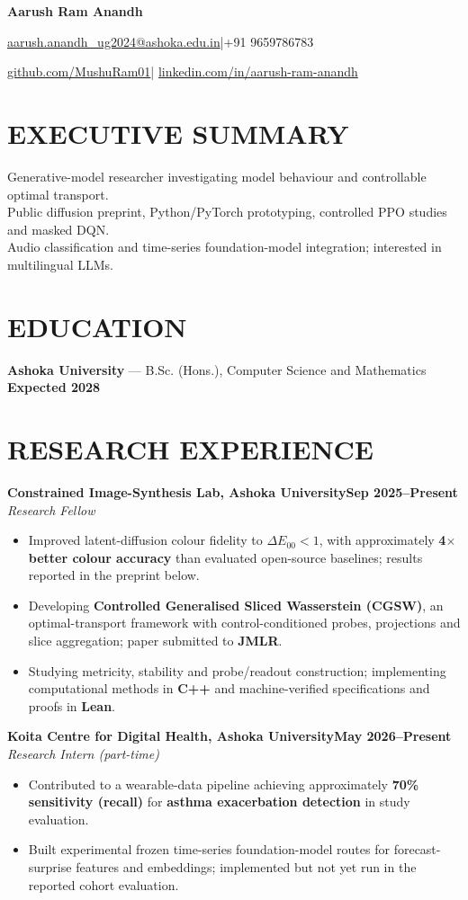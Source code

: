 \documentclass[10pt,a4paper]{article}
\newcommand{\entry}[3]{\noindent\textbf{#1}\hfill\textbf{#3}\\[-1pt]\textit{#2}\par}
\newenvironment{cvitems}{\begin{itemize}[leftmargin=1.1em,label=\textbullet,itemsep=2pt,topsep=3pt,parsep=0pt,partopsep=0pt]}{\end{itemize}}
\begin{document}
{\LARGE\bfseries Aarush Ram Anandh}\par\vspace{4pt}
\href{mailto:aarush.anandh_ug2024@ashoka.edu.in}{aarush.anandh\_ug2024@ashoka.edu.in}\quad|\quad +91 9659786783\par\vspace{2pt}
\href{https://github.com/MushuRam01}{github.com/MushuRam01}\quad|\quad
\href{https://www.linkedin.com/in/aarush-ram-anandh/}{linkedin.com/in/aarush-ram-anandh}\par

\section{EXECUTIVE SUMMARY}
Generative-model researcher investigating model behaviour and controllable optimal transport.\\
Public diffusion preprint, Python/PyTorch prototyping, controlled PPO studies and masked DQN.\\
Audio classification and time-series foundation-model integration; interested in multilingual LLMs.\par
\section{EDUCATION}
\textbf{Ashoka University} --- B.Sc. (Hons.), Computer Science and Mathematics \hfill \textbf{Expected 2028}
\section{RESEARCH EXPERIENCE}
\entry{Constrained Image-Synthesis Lab, Ashoka University}{Research Fellow}{Sep 2025--Present}
\begin{cvitems}
  \item Improved latent-diffusion colour fidelity to $\Delta E_{00}<1$, with approximately \textbf{4$\times$ better colour accuracy} than evaluated open-source baselines; results reported in the preprint below.
  \item Developing \textbf{Controlled Generalised Sliced Wasserstein (CGSW)}, an optimal-transport framework with control-conditioned probes, projections and slice aggregation; paper submitted to \textbf{JMLR}.
  \item Studying metricity, stability and probe/readout construction; implementing computational methods in \textbf{C++} and machine-verified specifications and proofs in \textbf{Lean}.
\end{cvitems}
\entry{Koita Centre for Digital Health, Ashoka University}{Research Intern (part-time)}{May 2026--Present}
\begin{cvitems}
  \item Contributed to a wearable-data pipeline achieving approximately \textbf{70\% sensitivity (recall)} for \textbf{asthma exacerbation detection} in study evaluation.
  \item Built experimental frozen time-series foundation-model routes for forecast-surprise features and embeddings; implemented but not yet run in the reported cohort evaluation.
\end{cvitems}
\end{document}

